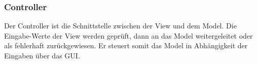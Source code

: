 \subsubsection*{Controller}
Der  Controller ist  die Schnittstelle  zwischen der  View und  dem Model. Die
Eingabe-Werte der View werden gepr\"uft,  dann an das Model weitergeleitet
oder als  fehlerhaft zur\"uckgewiesen. Er  steuert somit das Model in
 Abh\"angigkeit der Eingaben \"uber das GUI.
